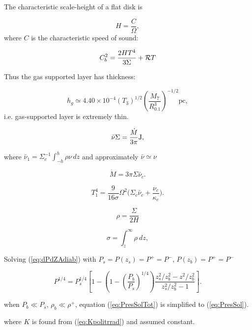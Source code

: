 \documentclass[12pt,english,preprint]{aastex}
\begin{document}
The characteristic scale-height of a flat disk is

\[
H=\frac{C}{\Omega},
\]
where $C$ is the characteristic speed of sound:

\[
C_{b}^{2}=\frac{2HT^{4}}{3\Sigma}+{\cal R}T
\]

Thus the gas supported layer has thickness:

\[
h_{g}\simeq4.40\times10^{-4}\left(T_{3}\right)^{1/2}\left(\frac{M_{7}}{R_{0.1}^{3}}\right)^{-1/2}\text{pc},
\]
i.e. gas-supported layer is extremely thin.

\[
\bar{\nu}\Sigma=\text{\ensuremath{\frac{\dot{M}}{3\pi}}J},
\]

where $\bar{\nu}_{1}=\Sigma_{c}^{-1}\int_{-h}^{h}\rho\nu\,dz$ and
approximately $\bar{\nu}\simeq\nu$

\[
\dot{M}=3\pi\Sigma\bar{\nu}_{c}.
\]

\[
T_{1}^{4}=\frac{9}{16\sigma}\Omega^{2}\text{(}\Sigma_{c}\bar{\nu}_{c}+\frac{\nu_{c}}{\kappa_{c}}\text{)}.
\]

\[
\rho=\frac{\Sigma}{2H}
\]

\[
\sigma=\int_{z}^{\infty}\rho\:dz,
\]

Solving (\ref{eq:dPdZAdiab}) with $P_{s}=P(z_{s})=P^{+}=P^{-}$,
$P(z_{b})=P^{+}=P^{-}$

\begin{equation}
P^{1/4}=P_{s}^{1/4}\left[1-\left(1-\left(\frac{P_{b}}{P_{s}}\right)^{1/4}\right)\frac{z_{s}^{2}/z_{b}^{2}-z^{2}/z_{b}^{2}}{z_{s}^{2}/z_{b}^{2}-1}\right]\mbox{.}\label{eq:PresSolTot}
\end{equation}

when $P_{b}\ll P_{s}$, $\rho_{b}\ll\rho^{+}$, equation (\ref{eq:PresSolTot})
is simplified to (\ref{eq:PresSol}).

where $K$ is found from (\ref{eq:Kpolitrrad}) and assumed constant.



\end{document}
